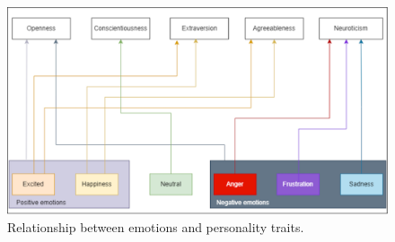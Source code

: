 \newpage
\begin{figure}[h]
  \centering
  \includegraphics[width=\textwidth]{figures/emotion_traits_link.png}
  \caption{Relationship between emotions and personality traits.}
  \label{fig:emotion_traits_link}
\end{figure}

